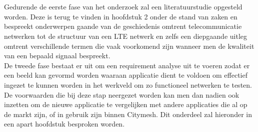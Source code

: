 
\chapter{}%
\label{ch:methodologie}


Gedurende de eerste fase van het onderzoek zal een literatuurstudie opgesteld worden. Deze is terug te vinden in hoofdstuk 2 onder de stand van zaken en bespreekt onderwerpen gaande van de geschiedenis omtrent telecommunicatie netwerken tot de structuur van een LTE netwerk en zelfs een diepgaande uitleg omtrent verschillende termen die vaak voorkomend zijn wanneer men de kwaliteit van een bepaald signaal bespreekt. \\

De tweede fase bestaat er uit om een requirement analyse uit te voeren zodat er een beeld kan gevormd worden waaraan applicatie dient te voldoen om effectief ingezet te kunnen worden in het werkveld om zo functioneel netwerken te testen. De voorwaarden die bij deze stap neergezet worden kan men dan nadien ook inzetten om de nieuwe applicatie te vergelijken met andere applicaties die al op de markt zijn, of in gebruik zijn binnen Citymesh. Dit onderdeel zal hieronder in een apart hoofdstuk besproken worden. \\

